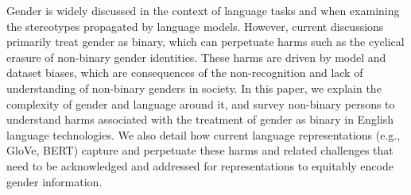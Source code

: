 Gender is widely discussed in the context of language tasks and when examining the stereotypes propagated by language models. However, current discussions primarily treat gender as binary, which can perpetuate harms such as the cyclical erasure of non-binary gender identities. These harms are driven by model and dataset biases, which are consequences of the non-recognition and lack of understanding of non-binary genders in society. In this paper, we explain the complexity of gender and language around it, and survey non-binary persons to understand harms associated with the treatment of gender as binary in English language technologies. We also detail how current language representations (e.g., GloVe, BERT) capture and perpetuate these harms and related challenges that need to be acknowledged and addressed for representations to equitably encode gender information.
